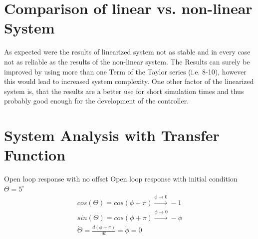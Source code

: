 \section{Comparison of linear vs. non-linear System}
\label{ssection:Comparison_lin_non_lin}
As expected were the results of linearized system not as stable and in every case not as reliable as the results of the non-linear system. The Results can surely be improved by using more than one Term of the Taylor series (i.e. 8-10), however this would lead to increased system complexity. One other factor of the linearized system is, that the results are a better use for short simulation times and thus probably good enough for the development of the controller. 

\section{System Analysis with Transfer Function}
Open loop response with no offset
Open loop response with initial condition $\Theta = 5^\circ$
\begin{align}\label{eq: 1}
        cos(\Theta)=cos(\phi+\pi)\xrightarrow{\phi\rightarrow0}-1\\
        sin(\Theta)=cos(\phi+\pi)\xrightarrow{\phi\rightarrow0}-\phi\\
        \dot{\Theta}=\frac{d(\phi+\pi)}{dt}=\dot{\phi}=0
\end{align}

